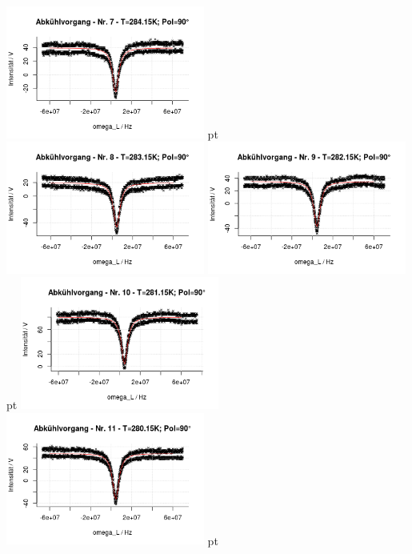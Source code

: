\documentclass[12pt]{article}
\begin{document}
\begin{minipage}[h!]{\textwidth}
	\centering
		
		\includegraphics[width=0.49\textwidth]{figures/cold90-7.png} pt
		\includegraphics[width=0.49\textwidth]{figures/cold90-8.png}\vskip -10pt
		\includegraphics[width=0.49\textwidth]{figures/cold90-9.png} pt
		\includegraphics[width=0.49\textwidth]{figures/cold90-10.png}\vskip -10pt
		\includegraphics[width=0.49\textwidth]{figures/cold90-11.png} pt

\end{minipage}
\end{document}
